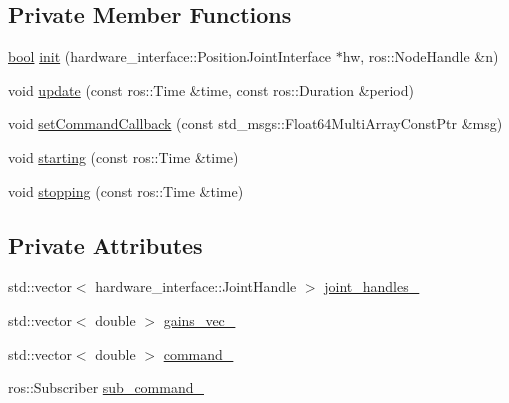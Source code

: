 \subsection*{Private Member Functions}
\begin{DoxyCompactItemize}
\item 
\hyperlink{classbool}{bool} \hyperlink{classpanda__simulation_1_1JointPositionController_a51edb4326fc39dafe64995e0361ba42c}{init} (hardware\+\_\+interface\+::\+Position\+Joint\+Interface $\ast$hw, ros\+::\+Node\+Handle \&n)
\item 
void \hyperlink{classpanda__simulation_1_1JointPositionController_a150196b32f6c3b16e12f5e1299ff7d1f}{update} (const ros\+::\+Time \&time, const ros\+::\+Duration \&period)
\item 
void \hyperlink{classpanda__simulation_1_1JointPositionController_a047694491f9c2f2f2c241050eb4bc31b}{set\+Command\+Callback} (const std\+\_\+msgs\+::\+Float64\+Multi\+Array\+Const\+Ptr \&msg)
\item 
void \hyperlink{classpanda__simulation_1_1JointPositionController_abf14b8f401436166eff03fff6a74da3c}{starting} (const ros\+::\+Time \&time)
\item 
void \hyperlink{classpanda__simulation_1_1JointPositionController_ae9f9e37acb3adfe43d282b1ade9e24f2}{stopping} (const ros\+::\+Time \&time)
\end{DoxyCompactItemize}
\subsection*{Private Attributes}
\begin{DoxyCompactItemize}
\item 
std\+::vector$<$ hardware\+\_\+interface\+::\+Joint\+Handle $>$ \hyperlink{classpanda__simulation_1_1JointPositionController_ada43d341b944aece64c6c6928cbc9060}{joint\+\_\+handles\+\_\+}
\item 
std\+::vector$<$ double $>$ \hyperlink{classpanda__simulation_1_1JointPositionController_ad673fc63239d994614aa233965d391e9}{gains\+\_\+vec\+\_\+}
\item 
std\+::vector$<$ double $>$ \hyperlink{classpanda__simulation_1_1JointPositionController_ab383d39c84291789c8b51c2b4ea08439}{command\+\_\+}
\item 
ros\+::\+Subscriber \hyperlink{classpanda__simulation_1_1JointPositionController_a770fa8018c5ee48c3142ee03c44a2941}{sub\+\_\+command\+\_\+}
\end{DoxyCompactItemize}


